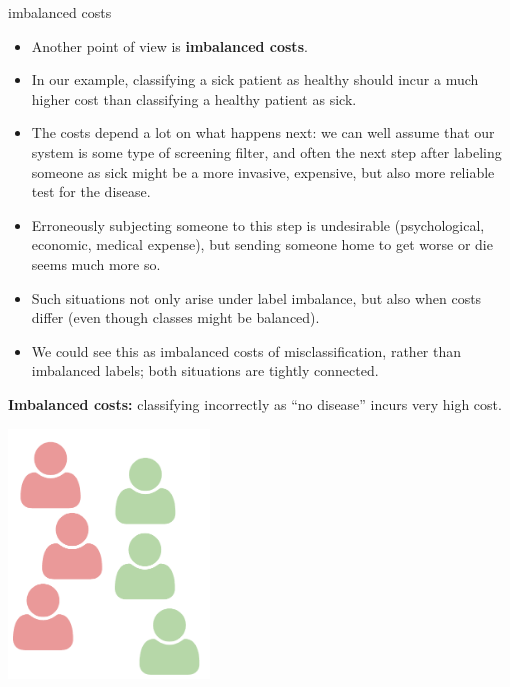 \documentclass[11pt,compress,t,notes=noshow, xcolor=table]{beamer}
\begin{document}
\begin{vbframe}{imbalanced costs}

\begin{itemize}
  \item Another point of view is \textbf{imbalanced costs}.
  \item In our example, classifying a sick patient as healthy should incur a
  much higher cost than classifying a healthy patient as sick.
  \item The costs depend a lot on what happens next: we can well assume that
  our system is some type of screening filter, and often the next step after
  labeling someone as sick might be a more invasive, expensive, but also  more
  reliable test for the disease.
  \item Erroneously subjecting someone to this step is undesirable
  (psychological, economic, medical expense), but sending someone home to get
  worse or die seems much more so.
  \item Such situations not only arise under label imbalance, but also when
  costs differ (even though classes might be balanced).
  \item We could see this as imbalanced costs of misclassification, rather than
  imbalanced labels; both situations are tightly connected.
\end{itemize}

\framebreak

\lz

\begin{minipage}[c]{0.65\textwidth}
  \raggedright
  \textbf{Imbalanced costs: } classifying incorrectly as \enquote{no disease}
  incurs very high cost.
\end{minipage}%
\begin{minipage}[c]{0.35\textwidth}
  \centering
  \includegraphics[trim = 0 0 0 10, clip, width=0.4\textwidth]
  {figure_man/imbalanced-costs.pdf}
\end{minipage}


\end{vbframe}
\end{document}

